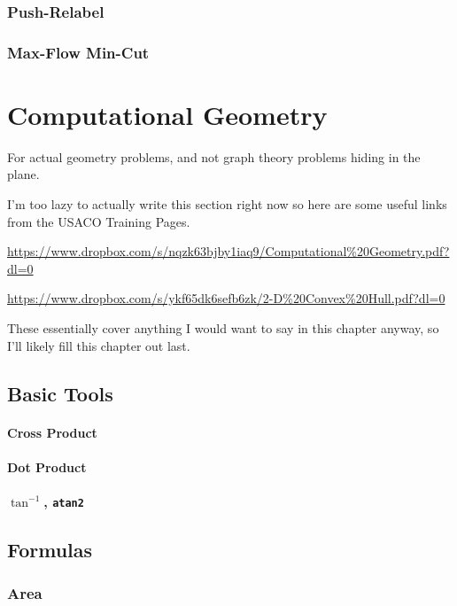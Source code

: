 \documentclass[11pt]{book}
\begin{document}
\subsection{Push-Relabel}

\subsection{Max-Flow Min-Cut}

\chapter{Computational Geometry}

For actual geometry problems, and not graph theory problems hiding in the plane.

I'm too lazy to actually write this section right now so here are some useful links from the USACO Training Pages.

\url{https://www.dropbox.com/s/nqzk63bjby1iaq9/Computational%20Geometry.pdf?dl=0}

\url{https://www.dropbox.com/s/ykf65dk6sefb6zk/2-D%20Convex%20Hull.pdf?dl=0}

These essentially cover anything I would want to say in this chapter anyway, so I'll likely fill this chapter out last.

\section{Basic Tools}

\subsubsection{Cross Product}

\subsubsection{Dot Product}

\subsubsection{$\tan^{-1}$, \texttt{atan2}}

\section{Formulas}

\subsection{Area}
\end{document}
